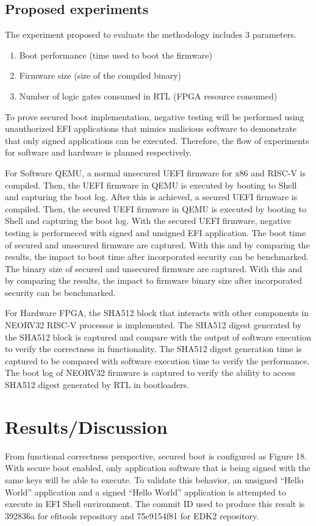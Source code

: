 \documentclass[review]{elsarticle}
\begin{document}
\subsection{ Proposed experiments}
The experiment proposed to evaluate the methodology includes 3 parameters.
\begin{enumerate}
\itemsep=-1pt 		%
\itemindent=0pt 	%
\item 
Boot performance (time used to boot the firmware)
\item 
Firmware size (size of the compiled binary)
\item 
Number of logic gates consumed in RTL (FPGA resource consumed)
\end{enumerate}

To prove secured boot implementation, negative testing will be performed using unauthorized EFI applications that mimics malicious software to demonstrate that only signed applications can be executed. Therefore, the flow of experiments for software and hardware is planned respectively.

For Software QEMU, a normal unsecured UEFI firmware for x86 and RISC-V is compiled. Then, the UEFI firmware in QEMU is executed by booting to Shell and capturing the boot log.
After this is achieved, a secured UEFI firmware is compiled. Then, the secured UEFI firmware in QEMU is executed by booting to Shell and capturing the boot log.
With the secured UEFI firmware, negative testing is performeced with signed and unsigned EFI application.
The boot time of secured and unsecured firmware are captured. With this and by comparing the results, the impact to boot time after incorporated security can be benchmarked.
The binary size of secured and unsecured firmware are captured. With this and by comparing the results, the impact to firmware binary size after incorporated security can be benchmarked.

For Hardware FPGA, the SHA512 block that interacts with other components in NEORV32 RISC-V processor is implemented.
The SHA512 digest generated by the SHA512 block is captured and compare with the output of software execution to verify the correctness in functionality.
The SHA512 digest generation time is captured to be compared with software execution time to verify the performance.
The boot log of NEORV32 firmware is captured to verify the ability to access SHA512 digest generated by RTL in bootloaders.


\section{ Results/Discussion}
From functional correctness perspective, secured boot is configured as Figure 18. With secure boot enabled, only application software that is being signed with the same keys will be able to execute. To validate this behavior, an unsigned “Hello World” application and a signed “Hello World” application is attempted to execute in EFI Shell environment. The commit ID used to produce this result is 392836a for efitools repository and 75e9154f81 for EDK2 repository.
\end{document}
